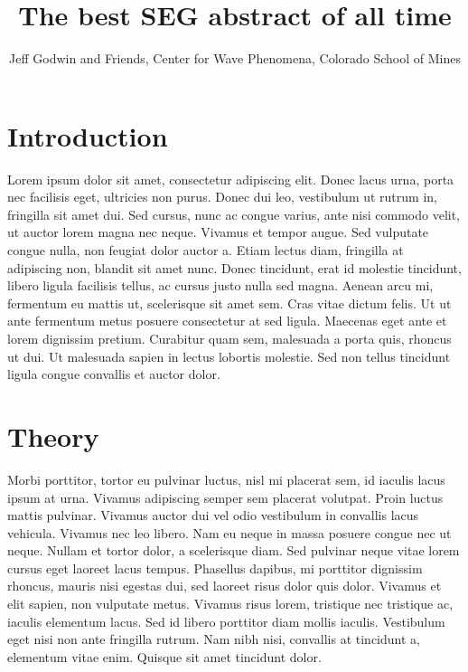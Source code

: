 
\title{The best SEG abstract of all time}
\author{Jeff Godwin and Friends, Center for Wave Phenomena, Colorado School of Mines}

\maketitle

\section{Introduction}

Lorem ipsum dolor sit amet, consectetur adipiscing elit. Donec lacus urna, porta nec facilisis eget, ultricies non purus. Donec dui leo, vestibulum ut rutrum in, fringilla sit amet dui. Sed cursus, nunc ac congue varius, ante nisi commodo velit, ut auctor lorem magna nec neque. Vivamus et tempor augue. Sed vulputate congue nulla, non feugiat dolor auctor a. Etiam lectus diam, fringilla at adipiscing non, blandit sit amet nunc. Donec tincidunt, erat id molestie tincidunt, libero ligula facilisis tellus, ac cursus justo nulla sed magna. Aenean arcu mi, fermentum eu mattis ut, scelerisque sit amet sem. Cras vitae dictum felis. Ut ut ante fermentum metus posuere consectetur at sed ligula. Maecenas eget ante et lorem dignissim pretium. Curabitur quam sem, malesuada a porta quis, rhoncus ut dui. Ut malesuada sapien in lectus lobortis molestie. Sed non tellus tincidunt ligula congue convallis et auctor dolor.

\section{Theory}
Morbi porttitor, tortor eu pulvinar luctus, nisl mi placerat sem, id iaculis lacus ipsum at urna. Vivamus adipiscing semper sem placerat volutpat. Proin luctus mattis pulvinar. Vivamus auctor dui vel odio vestibulum in convallis lacus vehicula. Vivamus nec leo libero. Nam eu neque in massa posuere congue nec ut neque. Nullam et tortor dolor, a scelerisque diam. Sed pulvinar neque vitae lorem cursus eget laoreet lacus tempus. Phasellus dapibus, mi porttitor dignissim rhoncus, mauris nisi egestas dui, sed laoreet risus dolor quis dolor. Vivamus et elit sapien, non vulputate metus. Vivamus risus lorem, tristique nec tristique ac, iaculis elementum lacus. Sed id libero porttitor diam mollis iaculis. Vestibulum eget nisi non ante fringilla rutrum. Nam nibh nisi, convallis at tincidunt a, elementum vitae enim. Quisque sit amet tincidunt dolor.


